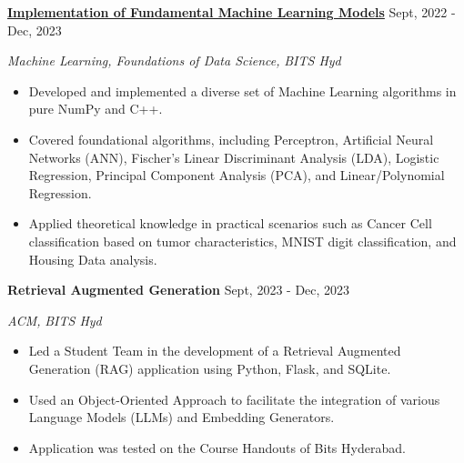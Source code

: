 \documentclass[a4paper,12pt]{report}
\newcommand{\marginAdj}{0.5in}
\begin{document}
\noindent 
\textbf{\href{https://github.com/MSSRPRAD/DS-Algorithms}{\color{black}Implementation of Fundamental Machine Learning Models}} \hspace*{1.00in}\hspace*{\marginAdj} {\fontsize{12pt}{12pt}\selectfont Sept, 2022 - Dec, 2023} \par
\noindent
{\fontsize{12pt}{12pt}\selectfont \textit{Machine Learning, Foundations of Data Science,}\hfill\textit{ BITS Hyd}} \par
\noindent 
\begin{itemize}[noitemsep,topsep=0pt]
    \item {\fontsize{12pt}{12pt}\selectfont Developed and implemented a diverse set of Machine Learning algorithms in pure NumPy and C++.}  \par
    \item {\fontsize{12pt}{12pt}\selectfont Covered foundational algorithms, including Perceptron, Artificial Neural Networks (ANN), Fischer's Linear Discriminant Analysis (LDA), Logistic Regression, Principal Component Analysis (PCA), and Linear/Polynomial Regression.}  \par
    \item {\fontsize{12pt}{12pt}\selectfont Applied theoretical knowledge in practical scenarios such as Cancer Cell classification based on tumor characteristics, MNIST digit classification, and Housing Data analysis.}  \par
\end{itemize}

\noindent 
\textbf{Retrieval Augmented Generation} \hspace*{2.80in}\hspace*{\marginAdj} {\fontsize{12pt}{12pt}\selectfont Sept, 2023 - Dec, 2023} \par
\noindent
{\fontsize{12pt}{12pt}\selectfont \textit{ACM,}\hfill\textit{ BITS Hyd}} \par
\noindent 
\begin{itemize}[noitemsep,topsep=0pt]
    \item {\fontsize{12pt}{12pt}\selectfont Led a Student Team in the development of a Retrieval Augmented Generation (RAG) application using Python, Flask, and SQLite. } \par
    \item {\fontsize{12pt}{12pt}\selectfont Used an Object-Oriented Approach to facilitate the integration of various Language Models (LLMs) and Embedding Generators. } \par
    \item {\fontsize{12pt}{12pt}\selectfont Application was tested on the Course Handouts of Bits Hyderabad.} \par
\end{itemize}
\end{document}
